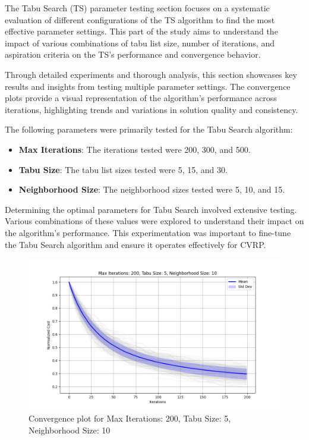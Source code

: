 \documentclass[
]{article}
\begin{document}
    The Tabu Search (TS) parameter testing section focuses on a systematic evaluation of different configurations of the TS algorithm to find the most effective parameter settings. This part of the study aims to understand the impact of various combinations of tabu list size, number of iterations, and aspiration criteria on the TS's performance and convergence behavior.

    Through detailed experiments and thorough analysis, this section showcases key results and insights from testing multiple parameter settings. The convergence plots provide a visual representation of the algorithm’s performance across iterations, highlighting trends and variations in solution quality and consistency.


    The following parameters were primarily tested for the Tabu Search algorithm:

    \begin{itemize}
        \item \textbf{Max Iterations}: The iterations tested were 200, 300, and 500.
        \item \textbf{Tabu Size}: The tabu list sizes tested were 5, 15, and 30.
        \item \textbf{Neighborhood Size}: The neighborhood sizes tested were 5, 10, and 15.
    \end{itemize}

    Determining the optimal parameters for Tabu Search involved extensive testing. Various combinations of these values were explored to understand their impact on the algorithm's performance. This experimentation was important to fine-tune the Tabu Search algorithm and ensure it operates effectively for CVRP.


    \begin{figure}[H]
        \centering
        \includegraphics[width=\textwidth]{tabu_search/max_iter_200_tabu_size_5_neighborhood_size_10}
        \caption{Convergence plot for Max Iterations: 200, Tabu Size: 5, Neighborhood Size: 10}
        \label{fig:ts_200_5_10}
    \end{figure}
\end{document}
